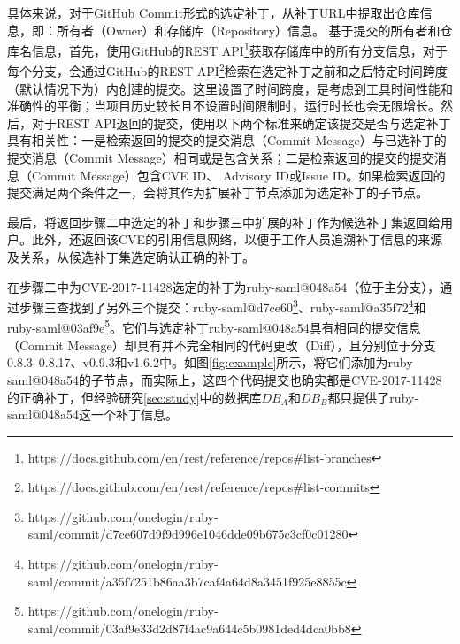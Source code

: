 具体来说，对于GitHub Commit形式的选定补丁，\tool 从补丁URL中提取出仓库信息，即：所有者（Owner）和存储库（Repository）信息。
基于提交的所有者和仓库名信息，首先，\tool 使用GitHub的REST API\footnote{https://docs.github.com/en/rest/reference/repos\#list-branches}获取存储库中的所有分支信息，对于每个分支，\tool 会通过GitHub的REST API\footnote{https://docs.github.com/en/rest/reference/repos\#list-commits}检索在选定补丁之前和之后特定时间跨度（默认情况下为）内创建的提交。这里设置了时间跨度，是考虑到工具时间性能和准确性的平衡；当项目历史较长且不设置时间限制时，\tool 运行时长也会无限增长。然后，对于REST API返回的提交，\tool 使用以下两个标准来确定该提交是否与选定补丁具有相关性：一是检索返回的提交的提交消息（Commit Message）与已选补丁的提交消息（Commit Message）相同或是包含关系；二是检索返回的提交的提交消息（Commit Message）包含CVE ID、 Advisory ID或Issue ID。如果检索返回的提交满足两个条件之一，\tool 会将其作为扩展补丁节点添加为选定补丁的子节点。

最后，\tool 将返回步骤二中选定的补丁和步骤三中扩展的补丁作为候选补丁集返回给用户。此外，\tool 还返回该CVE的引用信息网络，以便于工作人员追溯补丁信息的来源及关系，从候选补丁集选定确认正确的补丁。


\begin{exmp}
在步骤二中为CVE-2017-11428选定的补丁为ruby-saml@048a54（位于主分支），\tool 通过步骤三查找到了另外三个提交：ruby-saml@d7ce60\footnote{https://github.com/onelogin/ruby-saml/commit/d7ce607d9f9d996e1046dde09b675c3cf0c01280}、ruby-saml@a35f72\footnote{https://github.com/onelogin/ruby-saml/commit/a35f7251b86aa3b7caf4a64d8a3451f925e8855c}和ruby-saml@03af9e\footnote{https://github.com/onelogin/ruby-saml/commit/03af9e33d2d87f4ac9a644c5b0981ded4dca0bb8}。它们与选定补丁ruby-saml@048a54具有相同的提交信息（Commit Message）却具有并不完全相同的代码更改（Diff），且分别位于分支0.8.3--0.8.17、v0.9.3和v1.6.2中。如图\ref{fig:example}所示，\tool 将它们添加为ruby-saml@048a54的子节点，而实际上，这四个代码提交也确实都是CVE-2017-11428的正确补丁，但经验研究\ref{sec:study}中的数据库$DB_A$和$DB_B$都只提供了ruby-saml@048a54这一个补丁信息。
\end{exmp}